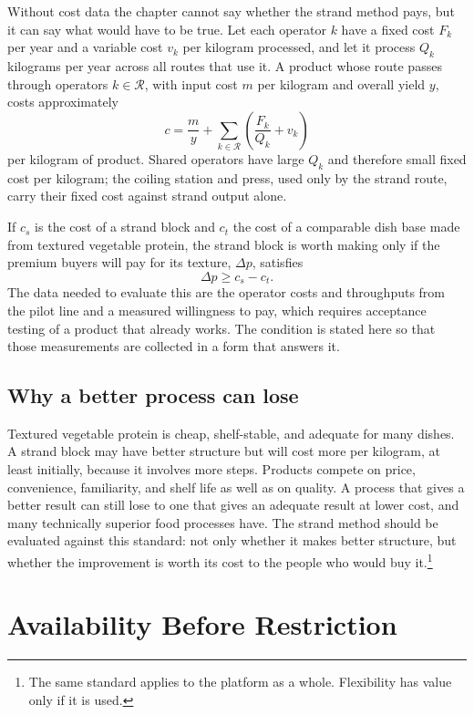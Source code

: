 \documentclass[11pt,openany]{book}
\theoremstyle{definition}
\begin{document}
Without cost data the chapter cannot say whether the strand method pays, but it can say what would have to be true. Let each operator $k$ have a fixed cost $F_k$ per year and a variable cost $v_k$ per kilogram processed, and let it process $Q_k$ kilograms per year across all routes that use it. A product whose route passes through operators $k \in \mathcal{R}$, with input cost $m$ per kilogram and overall yield $y$, costs approximately
\[
c = \frac{m}{y} + \sum_{k \in \mathcal{R}} \left( \frac{F_k}{Q_k} + v_k \right)
\]
per kilogram of product. Shared operators have large $Q_k$ and therefore small fixed cost per kilogram; the coiling station and press, used only by the strand route, carry their fixed cost against strand output alone.

If $c_s$ is the cost of a strand block and $c_t$ the cost of a comparable dish base made from textured vegetable protein, the strand block is worth making only if the premium buyers will pay for its texture, $\Delta p$, satisfies
\[
\Delta p \geq c_s - c_t .
\]
The data needed to evaluate this are the operator costs and throughputs from the pilot line and a measured willingness to pay, which requires acceptance testing of a product that already works. The condition is stated here so that those measurements are collected in a form that answers it.

\section{Why a better process can lose}

Textured vegetable protein is cheap, shelf-stable, and adequate for many dishes. A strand block may have better structure but will cost more per kilogram, at least initially, because it involves more steps. Products compete on price, convenience, familiarity, and shelf life as well as on quality. A process that gives a better result can still lose to one that gives an adequate result at lower cost, and many technically superior food processes have. The strand method should be evaluated against this standard: not only whether it makes better structure, but whether the improvement is worth its cost to the people who would buy it.\footnote{The same standard applies to the platform as a whole. Flexibility has value only if it is used.}

\chapter{Availability Before Restriction}\label{ch:availability}
\end{document}

